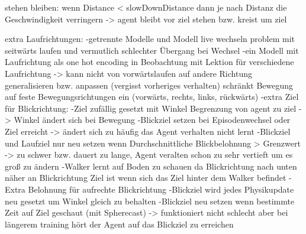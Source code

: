 stehen bleiben:
wenn Distance < slowDownDistance dann je nach Distanz die Geschwindigkeit verringern -> agent bleibt vor ziel stehen bzw. kreist um ziel

extra Laufrichtungen:
-getrennte Modelle und Modell live wechseln problem mit seitwärts laufen und vermutlich schlechter Übergang bei Wechsel
-ein Modell mit Laufrichtung als one hot encoding in Beobachtung mit Lektion für verschiedene Laufrichtung -> kann nicht von vorwärtslaufen auf andere Richtung generalisieren bzw. anpassen (vergisst vorheriges verhalten) schränkt Bewegung auf feste Bewegungsrichtungen ein (vorwärts, rechts, links, rückwärts)
-extra Ziel für Blickrichtung:
  -Ziel zufällig gesetzt mit Winkel Begrenzung von agent zu ziel -> Winkel ändert sich bei Bewegung
  -Blickziel setzen bei Episodenwechsel oder Ziel erreicht -> ändert sich zu häufig das Agent verhalten nicht lernt
  -Blickziel und Laufziel nur neu setzen wenn Durchschnittliche Blickbelohnung > Grenzwert -> zu schwer bzw. dauert zu lange, Agent veralten schon zu sehr vertieft um es groß zu ändern
  -Walker lernt auf Boden zu schauen da Blickrichtung nach unten näher an Blickrichtung Ziel ist wenn sich das Ziel hinter dem Walker befindet
  -Extra Belohnung für aufrechte Blickrichtung
  -Blickziel wird jedes Physikupdate neu gesetzt um Winkel gleich zu behalten
  -Blickziel neu setzen wenn bestimmte Zeit auf Ziel geschaut (mit Spherecast) -> funktioniert nicht schlecht aber bei längerem training hört der Agent auf das Blickziel zu erreichen